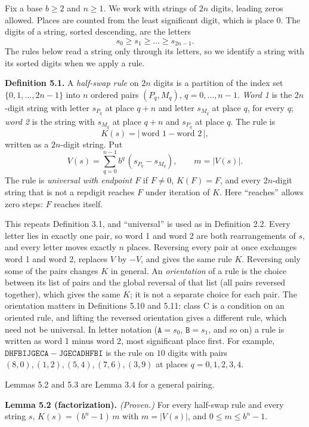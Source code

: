 \documentclass[11pt,letterpaper]{article}
\theoremstyle{paperstyle}
\theoremstyle{paperstyledef}
\theoremstyle{paperstylerem}
\begin{document}
Fix a base \(b \ge 2\) and \(n \ge 1\). We work with strings of \(2n\) digits, leading zeros allowed. Places are counted from the least significant digit, which is place \(0\). The digits of a string, sorted descending, are the letters \[s_0 \ge s_1 \ge \dots \ge s_{2n-1}.\] The rules below read a string only through its letters, so we identify a string with its sorted digits when we apply a rule.

\textbf{Definition 5.1.} A \emph{half-swap rule} on \(2n\) digits is a partition of the index set \(\{0, 1, \dots, 2n-1\}\) into \(n\) ordered pairs \((P_q, M_q)\), \(q = 0, \dots, n-1\). \emph{Word 1} is the \(2n\)-digit string with letter \(s_{P_q}\) at place \(q+n\) and letter \(s_{M_q}\) at place \(q\), for every \(q\); \emph{word 2} is the string with \(s_{M_q}\) at place \(q+n\) and \(s_{P_q}\) at place \(q\). The rule is \[K(s) = |\,\text{word 1} - \text{word 2}\,|,\] written as a \(2n\)-digit string. Put \[V(s) = \sum_{q=0}^{n-1} b^q \,(s_{P_q} - s_{M_q}), \qquad m = |V(s)|.\] The rule is \emph{universal with endpoint \(F\)} if \(F \ne 0\), \(K(F) = F\), and every \(2n\)-digit string that is not a repdigit reaches \(F\) under iteration of \(K\). Here ``reaches'' allows zero steps: \(F\) reaches itself.

This repeats Definition 3.1, and ``universal'' is used as in Definition 2.2. Every letter lies in exactly one pair, so word 1 and word 2 are both rearrangements of \(s\), and every letter moves exactly \(n\) places. Reversing every pair at once exchanges word 1 and word 2, replaces \(V\) by \(-V\), and gives the same rule \(K\). Reversing only some of the pairs changes \(K\) in general. An \emph{orientation} of a rule is the choice between its list of pairs and the global reversal of that list (all pairs reversed together), which gives the same \(K\); it is not a separate choice for each pair. The orientation matters in Definitions 5.10 and 5.11: class C is a condition on an oriented rule, and lifting the reversed orientation gives a different rule, which need not be universal. In letter notation (\(\mathtt{A} = s_0\), \(\mathtt{B} = s_1\), and so on) a rule is written as word 1 minus word 2, most significant place first. For example, \(\mathtt{DHFBIJGECA} - \mathtt{JGECADHFBI}\) is the rule on \(10\) digits with pairs \((8,0), (1,2), (5,4), (7,6), (3,9)\) at places \(q = 0, 1, 2, 3, 4\).

Lemmas 5.2 and 5.3 are Lemma 3.4 for a general pairing.

\textbf{Lemma 5.2 (factorization).} \emph{(Proven.)} For every half-swap rule and every string \(s\), \(K(s) = (b^n - 1)\,m\) with \(m = |V(s)|\), and \(0 \le m \le b^n - 1\).
\end{document}
